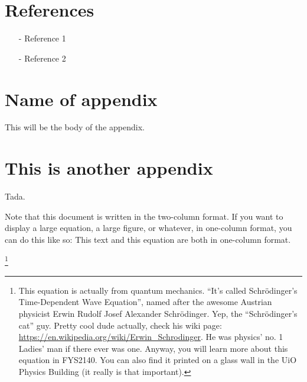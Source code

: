 \documentclass[reprint,english,notitlepage]{revtex4-2}  %
\begin{document}
\section*{References}  %
\begin{itemize}
\item[-]Reference 1
\item[-]Reference 2
\end{itemize}

\newpage
\appendix
\section{Name of appendix}
This will be the body of the appendix.
\section{This is another appendix}\label{appendix}
Tada.


\clearpage
Note that this document is written in the two-column format. If you want to display a large equation, a large figure, or whatever, in one-column format, you can do this like so:
\onecolumngrid
\vspace{1cm} %
This text and this equation are both in one-column format.

\footnote{This equation is actually from quantum mechanics. ``It's called Schrödinger's Time-Dependent Wave Equation'', named after the awesome Austrian physicist Erwin Rudolf Josef Alexander Schrödinger. Yep, the ``Schrödinger's cat'' guy. Pretty cool dude actually, check his wiki page: \url{https://en.wikipedia.org/wiki/Erwin_Schrodinger}. He was physics' no. 1 Ladies' man if there ever was one. Anyway, you will learn more about this equation in FYS2140. You can also find it printed on a glass wall in the UiO Physics Building (it really is that important).}
\end{document}
